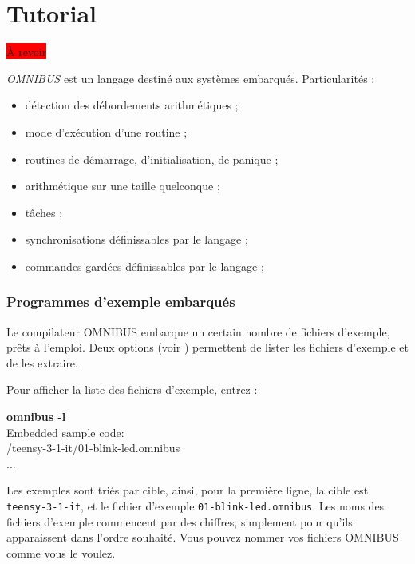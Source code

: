 

\chapter{Tutorial}

\thispagestyle{empty}

\colorbox{red}{À revoir}


\emph{OMNIBUS} est un langage destiné aux systèmes embarqués. Particularités :
\begin{itemize}
  \item détection des débordements arithmétiques ;
  \item mode d'exécution d'une routine ;
  \item routines de démarrage, d'initialisation, de panique ;
  \item arithmétique sur une taille quelconque ;
  \item tâches ;
  \item synchronisations définissables par le langage ;
  \item commandes gardées définissables par le langage ;
\end{itemize}



\subsection{Programmes d'exemple embarqués}

Le compilateur OMNIBUS embarque un certain nombre de fichiers d'exemple, prêts à l'emploi. Deux options (voir ) permettent de lister les fichiers d'exemple et de les extraire.

Pour afficher la liste des fichiers d'exemple, entrez :

\begin{SHELL}
{\bfseries omnibus -l}\\
Embedded sample code:\\
\hspace*{1.2em}/teensy-3-1-it/01-blink-led.omnibus\\
\hspace*{1.2em}...
\end{SHELL}

Les exemples sont triés par cible, ainsi, pour la première ligne, la cible est \texttt{teensy-3-1-it}, et le fichier d'exemple \texttt{01-blink-led.omnibus}. Les noms des fichiers d'exemple commencent par des chiffres, simplement pour qu'ils apparaissent dans l'ordre souhaité. Vous pouvez nommer vos fichiers OMNIBUS comme vous le voulez.

